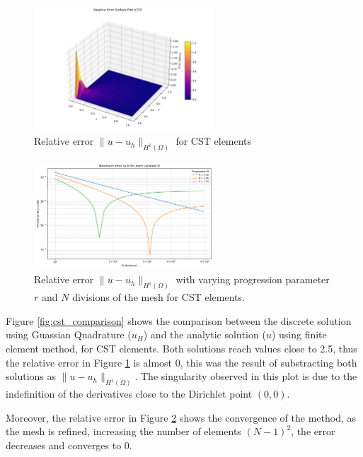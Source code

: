 \begin{figure}[H]
\centering
\includegraphics[width=0.6\textwidth]{GRAFICOS/CST/CST_relative_error_surface_plot.png}
\caption{Relative error \(\|u - u_h\|_{H^1(\Omega)}\) for CST elements}
\label{fig:cst_error_vs_h}
\end{figure}

\begin{figure}[H]
\centering
\includegraphics[width=0.6\textwidth]{GRAFICOS/CST/errores_por_R.png}
\caption{Relative error \(\|u - u_h\|_{H^1(\Omega)}\) with varying progression parameter $r$ and $N$ divisions of the mesh for CST elements.}
\label{fig:cst_error_vs_h_loglog}
\end{figure}

Figure \ref{fig:cst_comparison} shows the comparison between the discrete solution using Guassian Quadrature ($u_H$) and the analytic solution ($u$) using finite element method, for CST elements. Both solutions reach values close to 2.5, thus the relative error in Figure \ref{fig:cst_error_vs_h} is almost 0, this was the result of substracting both solutions as \(\|u - u_h\|_{H^1(\Omega)}\). The singularity observed in this plot is due to the indefinition of the derivatives close to the Dirichlet point $(0,0)$. 

Moreover, the relative error in Figure \ref{fig:cst_error_vs_h_loglog} shows the convergence of the method, as the mesh is refined, increasing the number of elements $(N-1)^2$, the error decreases and converges to 0. 

